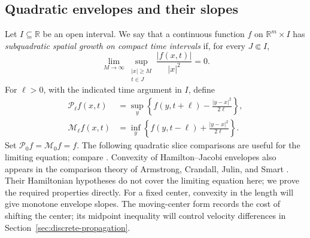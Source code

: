 \documentclass[11pt]{article}
\numberwithin{equation}{section}
\theoremstyle{definition}
\theoremstyle{remark}
\newcommand{\R}{\mathbb{R}}
\newcommand{\Penv}{\mathcal{P}}
\newcommand{\Menv}{\mathcal{M}}
\begin{document}
\subsection{Quadratic envelopes and their slopes}

Let $I\subseteq\R$ be an open interval. We say that a continuous
function $f$ on $\R^m\times I$ has \emph{subquadratic spatial
growth on compact time intervals} if, for every $J\Subset I$,
\[
  \lim_{M\to\infty}
  \sup_{\substack{|x|\ge M\\t\in J}}\frac{|f(x,t)|}{|x|^2}=0.
\]
For $\ell>0$, with the indicated time argument in $I$, define
\begin{equation}\label{eq:envelope-definitions}
  \begin{split}
  \Penv_\ell f(x,t)
    &=\sup_y\left\{f(y,t+\ell)-\frac{|y-x|^2}{2\ell}\right\},\\
  \Menv_\ell f(x,t)
    &=\inf_y\left\{f(y,t-\ell)+\frac{|y-x|^2}{2\ell}\right\}.
  \end{split}
\end{equation}
Set $\Penv_0f=\Menv_0f=f$. The following quadratic slice
comparisons are useful for the limiting equation; compare
\cite[Section~3]{EvansSavin2008}. Convexity of Hamilton--Jacobi envelopes also
appears in the comparison theory of Armstrong, Crandall, Julin, and Smart
\cite[Proposition~2.3]{ArmstrongCrandallJulinSmart2011}. Their Hamiltonian
hypotheses do not cover the limiting equation here; we prove the required
properties directly.
For a fixed center, convexity in the length will give monotone envelope
slopes. The moving-center form records the cost of shifting the center;
its midpoint inequality will control velocity differences in
Section~\ref{sec:discrete-propagation}.
\end{document}
